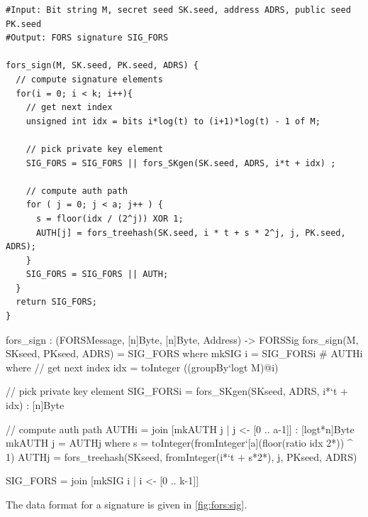 \begin{lstlisting}[label=alg:fors_sign, language=pseudoc,
                   caption=\forssign\ -- Generating a FORS signature on string $M$.]
#Input: Bit string M, secret seed SK.seed, address ADRS, public seed PK.seed
#Output: FORS signature SIG_FORS

fors_sign(M, SK.seed, PK.seed, ADRS) {  
  // compute signature elements 
  for(i = 0; i < k; i++){
    // get next index
    unsigned int idx = bits i*log(t) to (i+1)*log(t) - 1 of M;
    
    // pick private key element
    SIG_FORS = SIG_FORS || fors_SKgen(SK.seed, ADRS, i*t + idx) ;
    
    // compute auth path
    for ( j = 0; j < a; j++ ) {
      s = floor(idx / (2^j)) XOR 1;
      AUTH[j] = fors_treehash(SK.seed, i * t + s * 2^j, j, PK.seed, ADRS);
    } 
    SIG_FORS = SIG_FORS || AUTH;
  }
  return SIG_FORS;
}
\end{lstlisting}

\begin{code}
  fors_sign : (FORSMessage, [n]Byte, [n]Byte, Address) -> FORSSig
  fors_sign(M, SKseed, PKseed, ADRS) = SIG_FORS where
    mkSIG i = SIG_FORSi # AUTHi where
      // get next index
      idx = toInteger ((groupBy`{logt} M)@i)

      // pick private key element
      SIG_FORSi = fors_SKgen(SKseed, ADRS, i*`t + idx) : [n]Byte

      // compute auth path
      AUTHi = join [mkAUTH j | j <- [0 .. a-1]] : [logt*n]Byte
      mkAUTH j = AUTHj where
        s = toInteger(fromInteger`{[a]}(floor(ratio idx 2^^j)) ^ 1)
        AUTHj =
          fors_treehash(SKseed, fromInteger(i*`t + s*2^^j), j, PKseed, ADRS)

    SIG_FORS = join [mkSIG i | i <- [0 .. k-1]]
\end{code}

The data format for a signature is given in \autoref{fig:fors:sig}.

